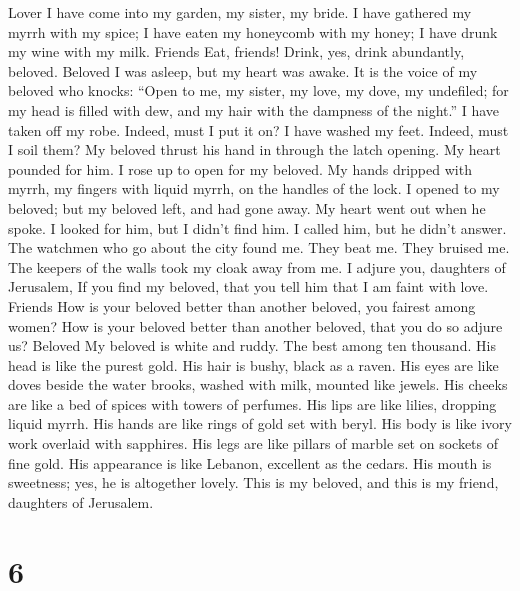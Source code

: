 Lover  I have come into my garden, my sister, my bride. I
have gathered my myrrh with my spice; I have eaten my honeycomb with my
honey; I have drunk my wine with my milk. Friends Eat, friends! Drink,
yes, drink abundantly, beloved. Beloved  I was asleep, but
my heart was awake. It is the voice of my beloved who knocks: ``Open to
me, my sister, my love, my dove, my undefiled; for my head is filled
with dew, and my hair with the dampness of the night.''  I
have taken off my robe. Indeed, must I put it on? I have washed my feet.
Indeed, must I soil them?  My beloved thrust his hand in
through the latch opening. My heart pounded for him.  I rose
up to open for my beloved. My hands dripped with myrrh, my fingers with
liquid myrrh, on the handles of the lock.  I opened to my
beloved; but my beloved left, and had gone away. My heart went out when
he spoke. I looked for him, but I didn't find him. I called him, but he
didn't answer.  The watchmen who go about the city found me.
They beat me. They bruised me. The keepers of the walls took my cloak
away from me.  I adjure you, daughters of Jerusalem, If you
find my beloved, that you tell him that I am faint with love. Friends
 How is your beloved better than another beloved, you
fairest among women? How is your beloved better than another beloved,
that you do so adjure us? Beloved  My beloved is white and
ruddy. The best among ten thousand.  His head is like the
purest gold. His hair is bushy, black as a raven.  His eyes
are like doves beside the water brooks, washed with milk, mounted like
jewels.  His cheeks are like a bed of spices with towers of
perfumes. His lips are like lilies, dropping liquid myrrh. 
His hands are like rings of gold set with beryl. His body is like ivory
work overlaid with sapphires.  His legs are like pillars of
marble set on sockets of fine gold. His appearance is like Lebanon,
excellent as the cedars.  His mouth is sweetness; yes, he
is altogether lovely. This is my beloved, and this is my friend,
daughters of Jerusalem.

\hypertarget{section-5}{%
\section{6}\label{section-5}}


